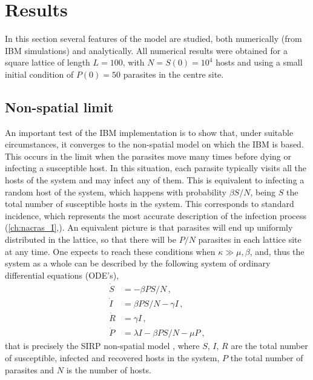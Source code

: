 \section{Results}\label{sec:results}
In this section several features of the model are studied, both numerically
(from IBM simulations) and analytically. All numerical results were obtained
for a square lattice of length $L=100$, with $N=S(0)=10^4$ hosts and using a
small initial condition of $P(0)=50$ parasites in the centre site.

\subsection{Non-spatial limit} \label{sec:MFlimit}
An important test of the IBM implementation is to show that, under suitable
circumstances, it converges to the non-spatial model on which the IBM is based.
This occurs in the limit when the parasites move many times before dying or
infecting a susceptible host. In this situation, each parasite typically visits
all the hosts of the system and may infect any of them. This is equivalent to
infecting a random host of the system, which happens with probability $\beta
    S/N$, being $S$ the total number of susceptible hosts in the system.
This corresponds to standard incidence, which represents the most accurate
description of the infection process
(\cref{ch:nacras_I},\cite{GimenezRomero2021}).
An equivalent picture is that parasites will end up uniformly distributed in
the lattice, so that there will be $P/N$ parasites in each lattice site at any
time. One expects to reach these conditions when $\kappa\gg\mu,\beta$, and,
thus the system as a whole can be described by the following system of ordinary
differential equations (ODE's),
\begin{equation}\label{eq:SIRP_MF}
    \begin{aligned}
        \dot{S} & =-\beta P S/N \, ,               \\
        \dot{I} & =\beta P S/N-\gamma I \, ,       \\
        \dot{R} & =\gamma I \, ,                   \\
        \dot{P} & =\lambda I-\beta P S/N-\mu P \ ,
    \end{aligned}
\end{equation}
that is precisely the SIRP non-spatial model \cite{GimenezRomero2021}, where
$S$, $I$, $R$ are the total number of susceptible, infected and recovered hosts
in the system, $P$ the total number of parasites and $N$ is the number of
hosts.

